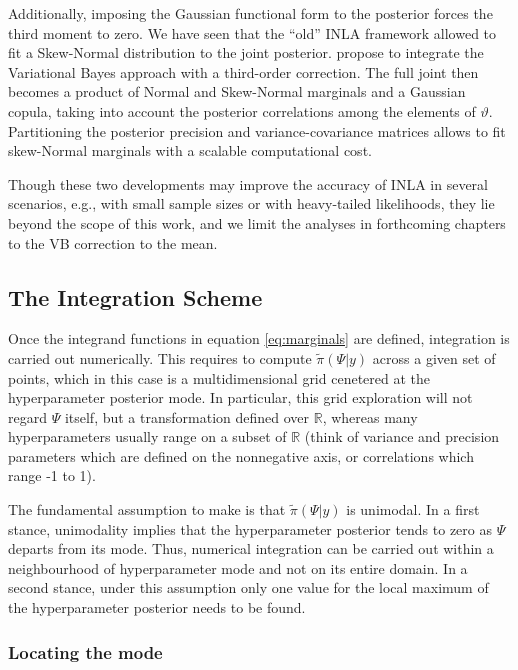 \documentclass[openany, 11pt, oneside]{book}
\begin{document}
Additionally, imposing the Gaussian functional form to the posterior forces the third moment to zero. We have seen that the ``old'' INLA framework allowed to fit a Skew-Normal distribution to the joint posterior. \cite{dutta2025scalable} propose to integrate the Variational Bayes approach with a third-order correction. The full joint then becomes a product of Normal and Skew-Normal marginals and a Gaussian copula, taking into account the posterior correlations among the elements of $\vartheta$. Partitioning the posterior precision and variance-covariance matrices allows to fit skew-Normal marginals with a scalable computational cost.

Though these two developments may improve the accuracy of INLA in several scenarios, e.g., with small sample sizes or with heavy-tailed likelihoods, they lie beyond the scope of this work, and we limit the analyses in forthcoming chapters to the VB correction to the mean.



\subsection{The Integration Scheme} \label{subsection:INLA_int}

Once the integrand functions in equation \ref{eq:marginals} are defined, integration is carried out numerically. This requires to compute $\tilde{\pi}(\Psi \vert y)$ across a given set of points, which in this case is a multidimensional grid cenetered at the hyperparameter posterior mode. In particular, this grid exploration will not regard $\Psi$ itself, but a transformation defined over $\mathbb{R}$, whereas many hyperparameters usually range on a subset of $\mathbb{R}$ (think of variance and precision parameters which are defined on the nonnegative axis, or correlations which range -1 to 1). 

The fundamental assumption to make is that $\tilde{\pi}(\Psi \vert y)$ is unimodal. In a first stance, unimodality implies that the hyperparameter posterior tends to zero as $\Psi$ departs from its mode. Thus, numerical integration can be carried out within a neighbourhood of hyperparameter mode and not on its entire domain. In a second stance, under this assumption only one value for the local maximum of the hyperparameter posterior needs to be found. 

\subsubsection{Locating the mode}
\end{document}
